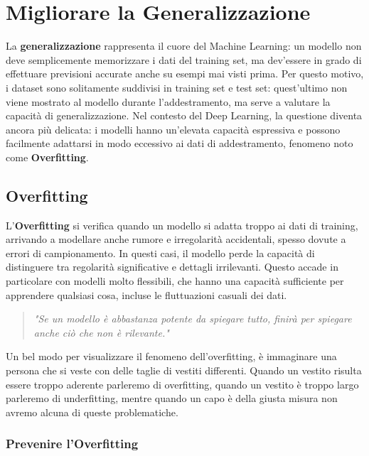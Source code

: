 \chapter{Migliorare la Generalizzazione}

La \textbf{generalizzazione} rappresenta il cuore del Machine Learning: un modello non deve semplicemente memorizzare i dati del training set, ma dev’essere in grado di effettuare previsioni accurate anche su esempi mai visti prima. Per questo motivo, i dataset sono solitamente suddivisi in training set e test set: quest’ultimo non viene mostrato al modello durante l’addestramento, ma serve a valutare la capacità di generalizzazione. Nel contesto del Deep Learning, la questione diventa ancora più delicata: i modelli hanno un’elevata capacità espressiva e possono facilmente adattarsi in modo eccessivo ai dati di addestramento, fenomeno noto come \textbf{Overfitting}.

\section{Overfitting}

L’\textbf{Overfitting} si verifica quando un modello si adatta troppo ai dati di training, arrivando a modellare anche rumore e irregolarità accidentali, spesso dovute a errori di campionamento. In questi casi, il modello perde la capacità di distinguere tra regolarità significative e dettagli irrilevanti. Questo accade in particolare con modelli molto flessibili, che hanno una capacità sufficiente per apprendere qualsiasi cosa, incluse le fluttuazioni casuali dei dati.

\begin{quote}
\emph{"Se un modello è abbastanza potente da spiegare tutto, finirà per spiegare anche ciò che non è rilevante."}
\end{quote}

\begin{Osservazione}
    Un bel modo per visualizzare il fenomeno dell'overfitting, è immaginare una persona che si veste con delle taglie di vestiti differenti. Quando un vestito risulta essere troppo aderente parleremo di overfitting, quando un vestito è troppo largo parleremo di underfitting, mentre quando un capo è della giusta misura non avremo alcuna di queste problematiche.
\end{Osservazione}

\subsection{Prevenire l’Overfitting}


